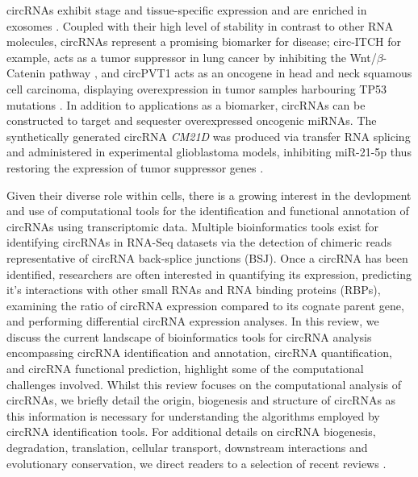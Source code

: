 circRNAs exhibit stage and tissue-specific expression \cite{circRNAfinder, Gruner2016, Rybak-Wolf2015Jun} and are enriched in exosomes \cite{Li2015Aug}. Coupled with their high level of stability in contrast to other RNA molecules, circRNAs represent a promising biomarker for disease; circ-ITCH for example, acts as a tumor suppressor in lung cancer by inhibiting the Wnt/$\beta$-Catenin pathway \cite{Wan2016}, and circPVT1 acts as an oncogene in head and neck squamous cell carcinoma, displaying overexpression in tumor samples harbouring TP53 mutations \cite{Verduci2017Dec}. In addition to applications as a biomarker, circRNAs can be constructed to target and sequester overexpressed oncogenic miRNAs. The synthetically generated circRNA \textit{CM21D} was produced via transfer RNA splicing and administered in experimental glioblastoma models, inhibiting miR-21-5p thus restoring the expression of tumor suppressor genes \cite{Bayat2023Jun}. \par

Given their diverse role within cells, there is a growing interest in the devlopment and use of computational tools for the identification and functional annotation of circRNAs using transcriptomic data. Multiple bioinformatics tools exist for identifying circRNAs in RNA-Seq datasets via the detection of chimeric reads representative of circRNA back-splice junctions (BSJ). Once a circRNA has been identified, researchers are often interested in quantifying its expression, predicting it's interactions with other small RNAs and RNA binding proteins (RBPs), examining the ratio of circRNA expression compared to its cognate parent gene, and performing differential circRNA expression analyses. In this review, we discuss the current landscape of bioinformatics tools for circRNA analysis encompassing circRNA identification and annotation, circRNA quantification, and circRNA functional prediction, highlight some of the computational challenges involved. Whilst this review focuses on the computational analysis of circRNAs, we briefly detail the origin, biogenesis and structure of circRNAs as this information is necessary for understanding the algorithms employed by circRNA identification tools. For additional details on circRNA biogenesis, degradation, translation, cellular transport, downstream interactions and evolutionary conservation, we direct readers to a selection of recent reviews \cite{Greene2017Jun, Kristensen2019Nov, Li2018Aug, Ren2022Dec, Yang2021May, Huang2020, Panda2018, Santos-Rodriguez2021Sep}. \par

